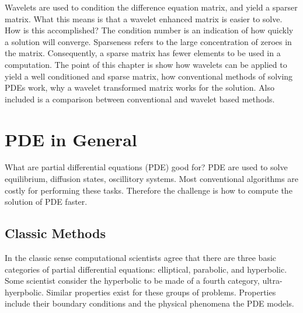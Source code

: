 
Wavelets are used to condition the difference equation matrix, and yield a %
sparser matrix.  What this means is that a wavelet enhanced matrix is easier to solve.  How is this accomplished?  The condition number is an indication of how quickly a solution will converge.    Sparseness refers to the large concentration of zeroes in the matrix.  Consequently, a sparse matrix has fewer elements to be used in a computation.  The point of this chapter is show how wavelets can be applied to yield a well conditioned and sparse matrix, how conventional methods of solving PDEs work,  why a wavelet transformed matrix works for the solution.  Also included is a comparison between conventional and wavelet based methods.  


\section {PDE in General}
What are partial differential equations (PDE) good for?  
PDE are used to solve %
equilibrium, diffusion states, oscillitory systems.  Most %
conventional algorithms are costly for performing these tasks.  Therefore the challenge is how to compute the solution of PDE faster.


\subsection {Classic Methods}
In the classic sense computational scientists agree that there are three basic %
categories of partial differential equations: elliptical, parabolic, and hyperbolic.  Some scientist consider the hyperbolic to be made of a fourth category, ultra-hyerpbolic.  %
Similar properties exist for these groups of problems.  Properties include their boundary conditions and the physical phenomena the PDE models.  %

